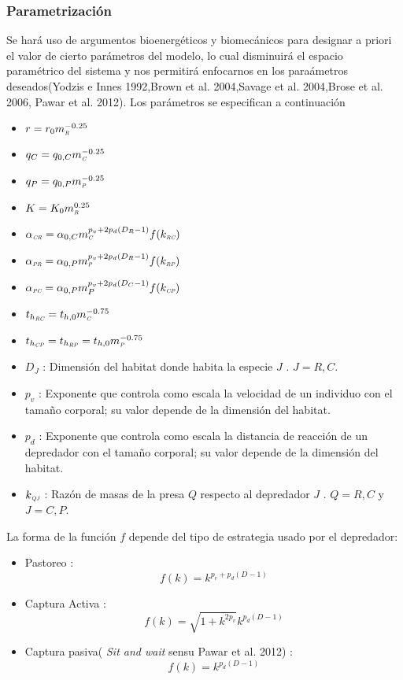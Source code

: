 \documentclass[a4paper,12pt]{article}
\newcommand{\PP}{\textit{\tiny P}}
\newcommand{\C}{\textit{\tiny C}}
\newcommand{\R}{\textit{\tiny R}}
\newcommand{\CR}{\textit{\tiny CR}}
\newcommand{\PC}{\textit{\tiny PC}}
\newcommand{\PR}{\textit{\tiny PR}}
\newcommand{\CP}{\textit{\tiny CP}}
\newcommand{\RC}{\textit{\tiny RC}}
\newcommand{\RP}{\textit{\tiny RP}}
\begin{document}
\subsubsection*{Parametrizaci\'on}
Se har\'a uso de argumentos bioenerg\'eticos y biomec\'anicos para designar a priori el valor de cierto par\'ametros del modelo, lo cual disminuir\'a el espacio param\'etrico del sistema y nos permitir\'a enfocarnos en los para\'ametros deseados(Yodzis e Innes 1992,Brown et al. 2004,Savage et al. 2004,Brose et al. 2006, Pawar et al. 2012). Los par\'ametros se especifican a continuaci\'on
\begin{itemize}
\item[]$r = r_0m_\R^{-0.25} $
\item[]$q_{C}=q_{0,C}m_\C^{-0.25}$
\item[]$q_{P}=q_{0,P}m_\PP^{-0.25}$
\item[]$K= K_{0}m_\R^{0.25} $
\item[]$\alpha_{\CR}= \alpha_{0,C}m_\C^{p_v+2p_d(D_R-1)}f(k_{\RC})$
\item[]$\alpha_{\PR}= \alpha_{0,P}m_\PP^{p_v+2p_d(D_R-1)}f(k_{\RP})$
\item[]$\alpha_{\PC}= \alpha_{0,P} m_P^{p_v+2p_d(D_C-1)}f(k_{\CP})$
\item[]$t_{h_{\RC}}=t_{h,0}m_\C^{-0.75}$
\item[]$t_{h_{\CP}} =t_{h_{\RP}}=t_{h,0}m_\PP^{-0.75}$
\item[]$D_J$ : Dimensi\'on del habitat donde habita la especie $J$ . $J = R,C$.
\item[]$p_v$ : Exponente que controla como escala la velocidad de un individuo con el tamaño corporal; su valor depende de la dimensi\'on del habitat.
\item[]$p_d$ : Exponente que controla como escala la distancia de reacci\'on de un depredador con el tamaño corporal; su valor depende de la dimensi\'on del habitat.
\item[]$ k_{\textit{\tiny QJ}}$ : Raz\'on de masas de la presa $Q$ respecto al depredador $J$ . $Q = R,C$ y $J= C,P$.	
\end{itemize}
La forma de la funci\'on $f$ depende del tipo de estrategia usado por el depredador:
\begin{itemize}
\item[] Pastoreo : \[ f(k) = k^{p_v+p_d(D - 1)}  \]  
\item[] Captura Activa : \[ f(k) = \sqrt {1+  k ^{2 p_v}} k^{p_d(D - 1)} \]
\item[] Captura pasiva( \textit{ Sit and wait} sensu Pawar et al. 2012) : \[ f(k) = k^ {p_d(D - 1)} \]
\end{itemize}
\end{document}
